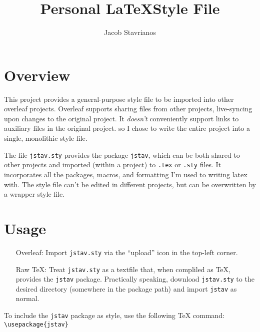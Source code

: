 \documentclass[12pt]{article}
\title{Personal \LaTeX Style File}
\author{Jacob Stavrianos}
\begin{document}
\maketitle

\section*{Overview}
This project provides a general-purpose style file to be imported into other overleaf projects. Overleaf supports sharing files from other projects, live-syncing upon changes to the original project. It \textit{doesn't} conveniently support links to auxiliary files in the original project. so I chose to write the entire project into a single, monolithic style file.

The file \texttt{jstav.sty} provides the package \texttt{jstav}, which can be both shared to other projects and imported (within a project) to \texttt{.tex} or \texttt{.sty} files. It incorporates all the packages, macros, and formatting I'm used to writing latex with. The style file can't be edited in different projects, but can be overwritten by a wrapper style file.

\section*{Usage}

\begin{itemize}
    \item [Overleaf: ] Import \texttt{jstav.sty} via the ``upload'' icon in the top-left corner.
    \item [Raw TeX: ] Treat \texttt{jstav.sty} as a textfile that, when compliled as TeX, provides the \texttt{jstav} package. Practically speaking, download \texttt{jstav.sty} to the desired directory (somewhere in the package path) and import \texttt{jstav} as normal.
\end{itemize}

To include the \texttt{jstav} package as style, use the following TeX command: \texttt{\textbackslash usepackage\{jstav\}}
\end{document}
